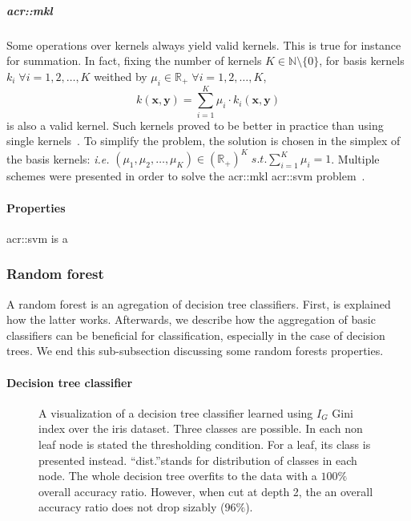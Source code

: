                 \subparagraph{\acrlong*{acr::mkl}}
                    Some operations over kernels always yield valid kernels.
                    This is true for instance for summation.
                    In fact, fixing the number of kernels $K\in \mathbb{N} \setminus \{0\}$, for basis kernels $k_i \; \forall i=1,2,\dots,K$ weithed by $\mu_i \in \mathbb{R}_+\; \forall i=1,2,\dots,K$,
                    \begin{equation*}
                        k(\bm{x}, \bm{y}) = \sum_{i=1}^K \mu_i \cdot k_i(\bm{x}, \bm{y})
                    \end{equation*}
                    is also a valid kernel.
                    Such kernels proved to be better in practice than using single kernels~\parencite{lanckriet2004statistical}.
                    To simplify the problem, the solution is chosen in the simplex of the basis kernels: \textit{i.e.} $ (\mu_1, \mu_2, \dots, \mu_K) \in (\mathbb{R}_+)^K  \; s.t. \sum_{i=1}^K \mu_i = 1$.
                    Multiple schemes were presented in order to solve the \gls{acr::mkl} \gls{acr::svm} problem~\parencite{rakotomamonjy2008simplemkl, sun2010multiple, varma2009more}.
                    
            \paragraph{Properties}
                \gls{acr::svm} is a
        \subsubsection{Random forest}
            A random forest is an agregation of decision tree classifiers.
            First, is explained how the latter works.
            Afterwards, we describe how the aggregation of basic classifiers can be beneficial for classification, especially in the case of decision trees.
            We end this sub-subsection discussing some random forests properties.

            \paragraph{Decision tree classifier}
                \begin{figure}
                    \centering
                    
                    \caption{
                        \label{fig::decision_tree_graph} A visualization of a decision tree classifier learned using $I_G$ Gini index over the iris dataset.
                        Three classes are possible.
                        In each non leaf node is stated the thresholding condition.
                        For a leaf, its class is presented instead.
                        ``dist.''stands for distribution of classes in each node.
                        The whole decision tree overfits to the data with a $100\%$ overall accuracy ratio.
                        However, when cut at depth 2, the an overall accuracy ratio does not drop sizably ($96\%$).
                    }
                \end{figure}

